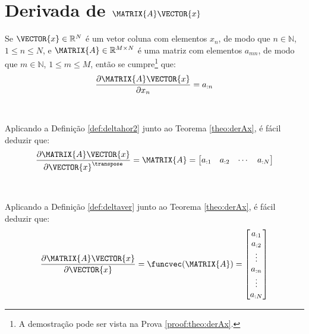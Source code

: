 
\section{Derivada de $\MATRIX{A}\VECTOR{x}$}

\begin{theorem}\label{theo:derAx}
Se 
$\VECTOR{x}\in \mathbb{R}^N$ é um vetor coluna com elementos $x_n$,
de modo que $n\in \mathbb{N}$, $1 \leq n \leq N$, e 
$\MATRIX{A} \in \mathbb{R}^{M\times N}$ é uma matriz com elementos $a_{mn}$,
de modo que $m\in \mathbb{N}$, $1 \leq m \leq M$, 
então se cumpre\footnote{A demostração pode ser vista na Prova \ref{proof:theo:derAx}.} que:
\begin{equation}
\frac{\partial \MATRIX{A}\VECTOR{x}}{\partial x_n}=a_{:n}
\end{equation}
\end{theorem}
~

\begin{corollary}\label{coro:derAx1}
Aplicando a Definição \ref{def:deltahor2} junto ao Teorema \ref{theo:derAx}, é
fácil deduzir que:
\begin{equation}
\frac{\partial \MATRIX{A}\VECTOR{x}}{\partial \VECTOR{x}^{\transpose}}=
\MATRIX{A}=
\left[
\begin{matrix}
 a_{:1} &  a_{:2} &  \cdots &  a_{:N}
\end{matrix}
\right]
\end{equation}
\end{corollary}
~

\begin{corollary}\label{coro:derAx2}
Aplicando a Definição \ref{def:deltaver} junto ao Teorema \ref{theo:derAx}, é
fácil deduzir que:
\begin{equation}
\frac{\partial \MATRIX{A}\VECTOR{x}}{\partial \VECTOR{x}}=\funcvec(\MATRIX{A})=
\left[
\begin{matrix}
 a_{:1} \\  
a_{:2} \\  
\vdots \\  
a_{:n} \\  
\vdots \\  
a_{:N}
\end{matrix}
\right]
\end{equation}
\end{corollary}

